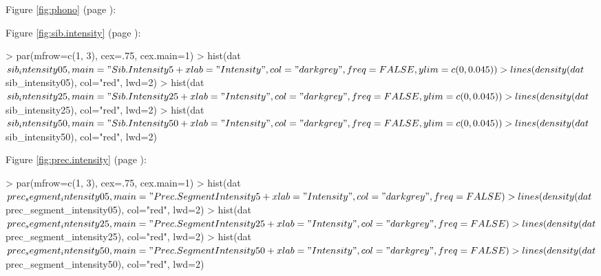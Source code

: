 \documentclass[a4paper]{article}
\begin{document}
Figure \ref{fig:phono} (page \pageref{fig:phono}):
\begin{Schunk}
\end{Schunk}

Figure \ref{fig:sib.intensity} (page \pageref{fig:sib.intensity}):
\begin{Schunk}
\begin{Sinput}
> par(mfrow=c(1, 3), cex=.75, cex.main=1)
> hist(dat$sib_intensity05, main="Sib. Intensity 5%
+      xlab="Intensity", col="darkgrey", freq=FALSE, ylim=c(0, 0.045))
> lines(density(dat$sib_intensity05), col="red", lwd=2)
> hist(dat$sib_intensity25, main="Sib. Intensity 25%
+      xlab="Intensity", col="darkgrey", freq=FALSE, ylim=c(0, 0.045))
> lines(density(dat$sib_intensity25), col="red", lwd=2)
> hist(dat$sib_intensity50, main="Sib. Intensity 50%
+      xlab="Intensity", col="darkgrey", freq=FALSE, ylim=c(0, 0.045))
> lines(density(dat$sib_intensity50), col="red", lwd=2)
\end{Sinput}
\end{Schunk}

Figure \ref{fig:prec.intensity} (page \pageref{fig:prec.intensity}):
\begin{Schunk}
\begin{Sinput}
> par(mfrow=c(1, 3), cex=.75, cex.main=1)
> hist(dat$prec_segment_intensity05, main="Prec. Segment Intensity 5%
+      xlab="Intensity", col="darkgrey", freq=FALSE)
> lines(density(dat$prec_segment_intensity05), col="red", lwd=2)
> hist(dat$prec_segment_intensity25, main="Prec. Segment Intensity 25%
+      xlab="Intensity", col="darkgrey", freq=FALSE)
> lines(density(dat$prec_segment_intensity25), col="red", lwd=2)
> hist(dat$prec_segment_intensity50, main="Prec. Segment Intensity 50%
+      xlab="Intensity", col="darkgrey", freq=FALSE)
> lines(density(dat$prec_segment_intensity50), col="red", lwd=2)
\end{Sinput}
\end{Schunk}
\end{document}
